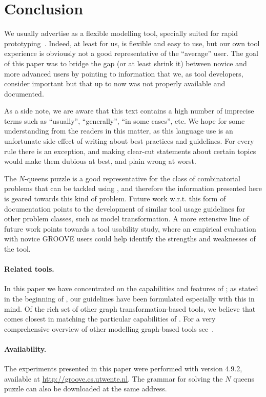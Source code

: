 
\section{Conclusion}

We usually advertise \GROOVE as a flexible modelling tool, specially suited for
rapid prototyping~\cite{GMR+12}. Indeed, at least for us, \GROOVE is flexible
and easy to use, but our own tool experience is obviously not a good
representative of the ``average'' user. The goal of this paper was to bridge
the gap (or at least shrink it) between novice and more advanced \GROOVE users
by pointing to information that we, as tool developers, consider important but
that up to now was not properly available and documented.

As a side note, we are aware that this text contains a high number of imprecise
terms such as ``usually'', ``generally'', ``in some cases'', etc. We hope for
some understanding from the readers in this matter, as this language use is
an unfortunate side-effect of writing about best practices and guidelines. For
every rule there is an exception, and making clear-cut statements about certain
topics would make them dubious at best, and plain wrong at worst.

The $N$-queens puzzle is a good representative for the class of combinatorial
problems that can be tackled using \GROOVE, and therefore the information
presented here is geared towards this kind of problem. Future work w.r.t. this
form of documentation points to the development of similar tool usage
guidelines for other problem classes, such as model transformation. A more
extensive line of future work points towards a tool usability study, where an
empirical evaluation with novice GROOVE users could help identify the strengths
and weaknesses of the tool.

\paragraph{Related tools.} In this paper we have concentrated on the
capabilities and features of \GROOVE; as stated in the beginning of
, our guidelines have been formulated especially with this in
mind. Of the rich set of other graph transformation-based tools, we believe that
\HENSHIN~\cite{HENSHIN} comes closest in matching the particular capabilities of
\GROOVE. For a very comprehensive overview of other modelling graph-based tools
see~\cite{Jakumeit+2013}.

\paragraph{Availability.} The experiments presented in this paper were
performed with \GROOVE version 4.9.2, available at
\url{http://groove.cs.utwente.nl}. The grammar for solving the $N$ queens puzzle
can also be downloaded at the same address.
